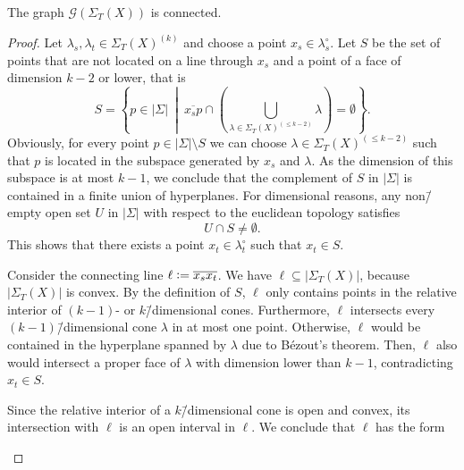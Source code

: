 \begin{prop}
	\label{proposition:git_fan_connected}
	The graph $\mathcal{G}(\Sigma_T(X))$ is connected.
\end{prop}
\begin{proof}
	Let $\lambda_s, \lambda_t\in\Sigma_T(X)^{(k)}$ and choose a point $x_s\in\lambda_s^\circ$. Let $S$ be the set of points that are not located on a line through $x_s$ and a point of a face of dimension $k-2$ or lower, that is
	$$S = \left\{p\in|\Sigma|\ \middle|\ \overline{x_s p} \cap \left(\bigcup_{\lambda\in\Sigma_T(X)^{(\leq k-2)}} \lambda\right) = \emptyset\right\}.$$
	Obviously, for every point $p\in |\Sigma|\setminus S$ we can choose $\lambda\in\Sigma_T(X)^{(\leq k-2)}$ such that $p$ is located in the subspace generated by $x_s$ and $\lambda$. As the dimension of this subspace is at most $k-1$, we conclude that the complement of $S$ in $|\Sigma|$ is contained in a finite union of hyperplanes.
	For dimensional reasons, any non\=/empty open set $U$ in $|\Sigma|$ with respect to the euclidean topology satisfies
	$$U\cap S \neq \emptyset.$$
	This shows that there exists a point $x_t\in\lambda_t^\circ$ such that $x_t\in S$.
	
	Consider the connecting line $\ell \mathrel{\mathop:}= \overline{x_s x_t}$. We have $\ell\subseteq|\Sigma_T(X)|$, because $|\Sigma_T(X)|$ is convex. By the definition of $S$, $\ell$ only contains points in the relative interior of $(k-1)$- or $k$\=/dimensional cones. Furthermore, $\ell$ intersects every $(k-1)$\=/dimensional cone $\lambda$ in at most one point. Otherwise, $\ell$ would be contained in the hyperplane spanned by $\lambda$ due to Bézout's theorem. Then, $\ell$ also would intersect a proper face of $\lambda$ with dimension lower than $k-1$, contradicting $x_t\in S$.
	
	Since the relative interior of a $k$\=/dimensional cone is open and convex, its intersection with $\ell$ is an open interval in $\ell$. We conclude that $\ell$ has the form
	
	\begin{center}
\end{center}
\end{proof}
